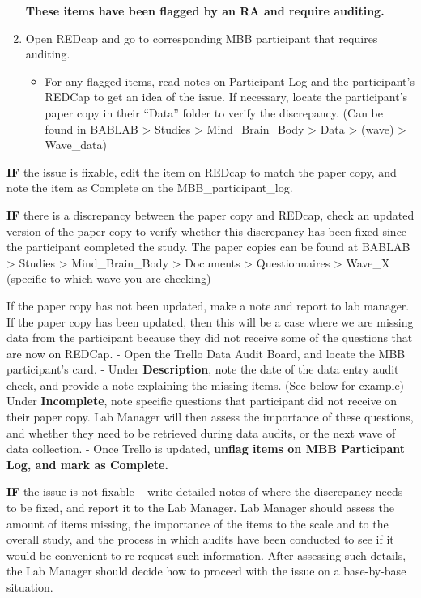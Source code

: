 \documentclass[
]{book}
\providecommand{\tightlist}{%
  \setlength{\itemsep}{0pt}\setlength{\parskip}{0pt}}
\begin{document}
\begin{enumerate}
  \textbf{These items have been flagged by an RA and require auditing.}
\item
  Open REDcap and go to corresponding MBB participant that requires auditing.

  \begin{itemize}
  \tightlist
  \item
    For any flagged items, read notes on Participant Log and the participant's REDCap to get an idea of the issue. If necessary, locate the participant's paper copy in their ``Data'' folder to verify the discrepancy. (Can be found in BABLAB \textgreater{} Studies \textgreater{} Mind\_Brain\_Body \textgreater{} Data \textgreater{} (wave) \textgreater{} Wave\_data)
  \end{itemize}
\end{enumerate}

\textbf{IF} the issue is fixable, edit the item on REDcap to match the paper copy, and note the item as Complete on the MBB\_participant\_log.

\textbf{IF} there is a discrepancy between the paper copy and REDcap, check an updated version of the paper copy to verify whether this discrepancy has been fixed since the participant completed the study. The paper copies can be found at BABLAB \textgreater{} Studies \textgreater{} Mind\_Brain\_Body \textgreater{} Documents \textgreater{} Questionnaires \textgreater{} Wave\_X (specific to which wave you are checking)

If the paper copy has not been updated, make a note and report to lab manager. If the paper copy has been updated, then this will be a case where we are missing data from the participant because they did not receive some of the questions that are now on REDCap.
- Open the Trello Data Audit Board, and locate the MBB participant's card.
- Under \textbf{Description}, note the date of the data entry audit check, and provide a note explaining the missing items. (See below for example)
- Under \textbf{Incomplete}, note specific questions that participant did not receive on their paper copy. Lab Manager will then assess the importance of these questions, and whether they need to be retrieved during data audits, or the next wave of data collection.
- Once Trello is updated, \textbf{unflag items on MBB Participant Log, and mark as Complete.}

\textbf{IF} the issue is not fixable -- write detailed notes of where the discrepancy needs to be fixed, and report it to the Lab Manager. Lab Manager should assess the amount of items missing, the importance of the items to the scale and to the overall study, and the process in which audits have been conducted to see if it would be convenient to re-request such information. After assessing such details, the Lab Manager should decide how to proceed with the issue on a base-by-base situation.
\end{document}
